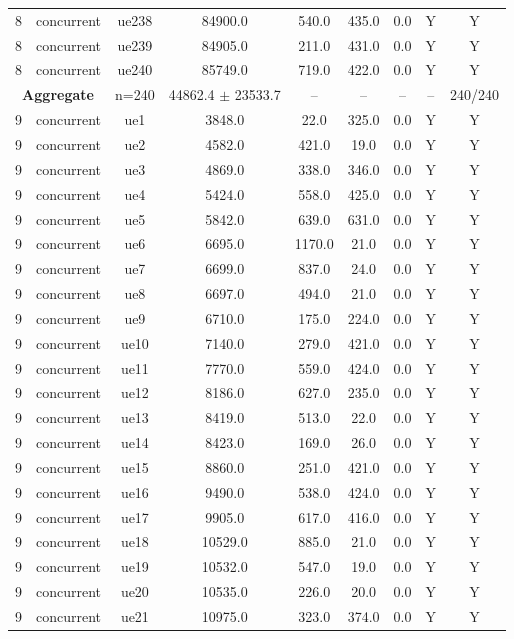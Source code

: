 \begin{table}[ht]
\begin{tabular}{|c|c|c|c|c|c|c|c|c|}
8 & concurrent & ue238 & 84900.0 & 540.0 & 435.0 & 0.0 & Y & Y \\
8 & concurrent & ue239 & 84905.0 & 211.0 & 431.0 & 0.0 & Y & Y \\
8 & concurrent & ue240 & 85749.0 & 719.0 & 422.0 & 0.0 & Y & Y \\
\multicolumn{2}{|c|}{\textbf{Aggregate}} & n=240 & 44862.4 $\pm$ 23533.7 & -- & -- & -- & -- & 240/240 \\
\hline
9 & concurrent & ue1 & 3848.0 & 22.0 & 325.0 & 0.0 & Y & Y \\
9 & concurrent & ue2 & 4582.0 & 421.0 & 19.0 & 0.0 & Y & Y \\
9 & concurrent & ue3 & 4869.0 & 338.0 & 346.0 & 0.0 & Y & Y \\
9 & concurrent & ue4 & 5424.0 & 558.0 & 425.0 & 0.0 & Y & Y \\
9 & concurrent & ue5 & 5842.0 & 639.0 & 631.0 & 0.0 & Y & Y \\
9 & concurrent & ue6 & 6695.0 & 1170.0 & 21.0 & 0.0 & Y & Y \\
9 & concurrent & ue7 & 6699.0 & 837.0 & 24.0 & 0.0 & Y & Y \\
9 & concurrent & ue8 & 6697.0 & 494.0 & 21.0 & 0.0 & Y & Y \\
9 & concurrent & ue9 & 6710.0 & 175.0 & 224.0 & 0.0 & Y & Y \\
9 & concurrent & ue10 & 7140.0 & 279.0 & 421.0 & 0.0 & Y & Y \\
9 & concurrent & ue11 & 7770.0 & 559.0 & 424.0 & 0.0 & Y & Y \\
9 & concurrent & ue12 & 8186.0 & 627.0 & 235.0 & 0.0 & Y & Y \\
9 & concurrent & ue13 & 8419.0 & 513.0 & 22.0 & 0.0 & Y & Y \\
9 & concurrent & ue14 & 8423.0 & 169.0 & 26.0 & 0.0 & Y & Y \\
9 & concurrent & ue15 & 8860.0 & 251.0 & 421.0 & 0.0 & Y & Y \\
9 & concurrent & ue16 & 9490.0 & 538.0 & 424.0 & 0.0 & Y & Y \\
9 & concurrent & ue17 & 9905.0 & 617.0 & 416.0 & 0.0 & Y & Y \\
9 & concurrent & ue18 & 10529.0 & 885.0 & 21.0 & 0.0 & Y & Y \\
9 & concurrent & ue19 & 10532.0 & 547.0 & 19.0 & 0.0 & Y & Y \\
9 & concurrent & ue20 & 10535.0 & 226.0 & 20.0 & 0.0 & Y & Y \\
9 & concurrent & ue21 & 10975.0 & 323.0 & 374.0 & 0.0 & Y & Y \\

\end{tabular}
\end{table}

